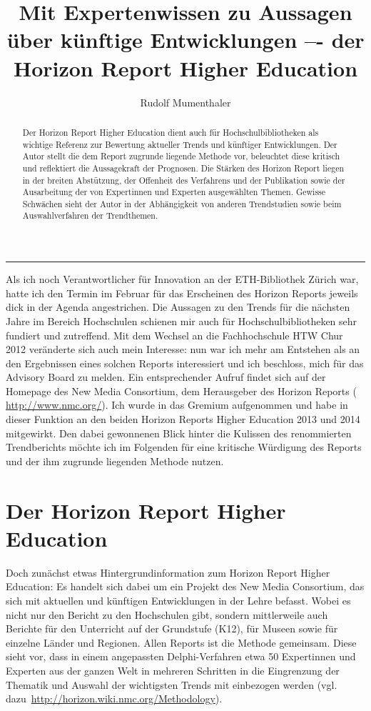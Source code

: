 \documentclass[a4paper,
fontsize=11pt,
oneside,
numbers=noperiodatend,
parskip=half-,
bibliography=totoc,
final
]{scrartcl}
\title{\LARGE{Mit Expertenwissen zu Aussagen über künftige Entwicklungen –- der Horizon Report Higher Education}} %
\author{Rudolf Mumenthaler} %
\date{}
\begin{document}
\maketitle
\thispagestyle{fancyplain} 



\begin{abstract}
\small
Der Horizon Report Higher Education dient auch für Hochschulbibliotheken als wichtige Referenz zur Bewertung aktueller Trends und künftiger Entwicklungen. Der Autor stellt die dem Report zugrunde liegende Methode vor, beleuchtet diese kritisch und reflektiert die Aussagekraft der Prognosen. Die Stärken des Horizon Report liegen in der breiten Abstützung, der Offenheit des Verfahrens und der Publikation sowie der Ausarbeitung der von Expertinnen und Experten ausgewählten Themen. Gewisse Schwächen sieht der Autor in der Abhängigkeit von anderen Trendstudien sowie beim Auswahlverfahren der Trendthemen.
\end{abstract}

\begin{center}\rule{3in}{0.4pt}\end{center}


Als ich noch Verantwortlicher für Innovation an der ETH-Bibliothek
Zürich war, hatte ich den Termin im Februar für das Erscheinen des
Horizon Reports jeweils dick in der Agenda angestrichen. Die Aussagen zu
den Trends für die nächsten Jahre im Bereich Hochschulen schienen mir
auch für Hochschulbibliotheken sehr fundiert und zutreffend. Mit dem
Wechsel an die Fachhochschule HTW Chur 2012 veränderte sich auch mein
Interesse: nun war ich mehr am Entstehen als an den Ergebnissen eines
solchen Reports interessiert und ich beschloss, mich für das Advisory
Board zu melden. Ein entsprechender Aufruf findet sich auf der Homepage
des New Media Consortium, dem Herausgeber des Horizon Reports (
\url{http://www.nmc.org/}). Ich wurde in das Gremium aufgenommen und
habe in dieser Funktion an den beiden Horizon Reports Higher Education
2013 und 2014 mitgewirkt. Den dabei gewonnenen Blick hinter die Kulissen
des renommierten Trendberichts möchte ich im Folgenden für eine
kritische Würdigung des Reports und der ihm zugrunde liegenden Methode
nutzen.

\section*{Der Horizon Report Higher
Education}\label{der-horizon-report-higher-education}

Doch zunächst etwas Hintergrundinformation zum Horizon Report Higher
Education: Es handelt sich dabei um ein Projekt des New Media
Consortium, das sich mit aktuellen und künftigen Entwicklungen in der
Lehre befasst. Wobei es nicht nur den Bericht zu den Hochschulen gibt,
sondern mittlerweile auch Berichte für den Unterricht auf der Grundstufe
(K12), für Museen sowie für einzelne Länder und Regionen. Allen Reports
ist die Methode gemeinsam. Diese sieht vor, dass in einem angepassten
Delphi-Verfahren etwa 50 Expertinnen und Experten aus der ganzen Welt in
mehreren Schritten in die Eingrenzung der Thematik und Auswahl der
wichtigsten Trends mit einbezogen werden (vgl.
dazu~\url{http://horizon.wiki.nmc.org/Methodology}).
\end{document}
